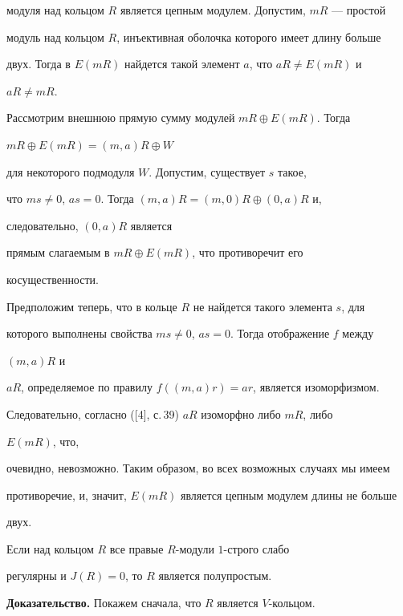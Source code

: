 модуля над кольцом $R$ является цепным модулем. Допустим, $mR$ --- простой  


модуль над кольцом $R$, инъективная оболочка которого имеет длину больше  


двух. Тогда в $E(mR)$ найдется такой элемент $a$, что $aR\ne E(mR)$ и 


$aR\ne mR$. 


Рассмотрим внешнюю прямую сумму модулей $mR\oplus E(mR)$. Тогда 


$mR\oplus E(mR)=(m,a)R\oplus W$ 


для некоторого подмодуля $W$. Допустим, существует $s$ такое,  


что $ms\ne0$, $as=0$. Тогда $(m,a)R=(m,0)R\oplus(0,a)R$ и, 


следовательно, $(0,a)R$ является  


прямым слагаемым в $mR\oplus E(mR)$, что противоречит его 


косущественности. 


 


Предположим теперь, что в кольце $R$ не найдется такого элемента $s$, для 


которого выполнены свойства $ms\ne0$, $as=0$. Тогда отображение $f$ между 


$(m,a)R$ и  


$aR$, определяемое по правилу $f((m,a)r)=ar$, является изоморфизмом.  


Следовательно, согласно ([4], с.\,39) $aR$ изоморфно либо $mR$, либо 


$E(mR)$, что,  


очевидно, невозможно. Таким образом, во всех возможных случаях мы имеем  


противоречие, и, значит, $E(mR)$ является цепным модулем длины не больше  


двух. 


 


\begin{lems} 


Если над кольцом $R$ все правые $R$-модули $1$-строго слабо 


регулярны и $J(R)=0$, то $R$ является полупростым. 


\end{lems} 


 


{\bf Доказательство.} Покажем сначала, что $R$ является $V$-кольцом. 



